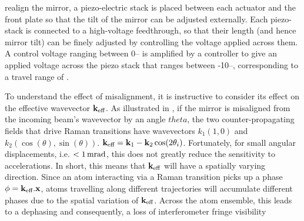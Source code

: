 realign the mirror, a piezo-electric stack is placed between each actuator
and the front plate so that the tilt of the mirror can be adjusted
externally. Each piezo-stack is connected to a high-voltage feedthrough, so
that their length (and hence mirror tilt) can be finely adjusted by
controlling the voltage applied across them. A control voltage ranging
between 0-- is amplified by a controller to give an
applied voltage across the piezo stack that ranges between
-10--, corresponding to a travel range of
.
\par\noindent
To understand the effect of misalignment, it is instructive to consider its
effect on the effective wavevector \({\textbf k_\textnormal{eff}}\). As illustrated in
, if the mirror is misaligned from the incoming
beam's wavevector by an angle \(theta\), the two counter-propagating fields
that drive Raman transitions have wavevectors \(k_1 \left(1,0\right)\) and
\(k_2 \left(\cos(\theta),\sin(\theta)\right)\). \({\textbf k_\textnormal{eff}} = {\textbf k_1} -
{\textbf k_2} \cos (2\theta_i)\). Fortunately, for small angular
displacements, i.e. \(< \sivalue{1}{\milli\radian}\), this does not greatly
reduce the sensitivity to accelerations. In short, this means that \({\textbf k_\textnormal{eff}}\)
will have a spatially varying direction. Since an atom interacting via a
Raman transition picks up a phase \(\phi = {\textbf k_\textnormal{eff}} . {\textbf x}\), atoms
travelling along different trajectories will accumulate different phases due
to the spatial variation of \({\textbf k_\textnormal{eff}}{}\). Across the atom ensemble, this leads
to a dephasing and consequently, a loss of interferometer fringe
visibility~\cite{Tackmann2012}

